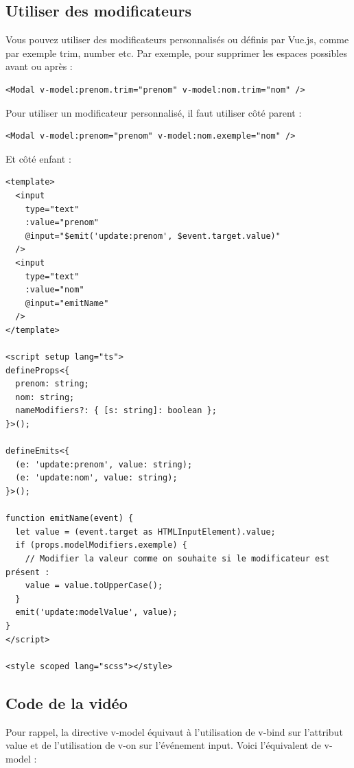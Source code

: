 \subsection{Utiliser des modificateurs}
Vous pouvez utiliser des modificateurs personnalisés ou définis par {\color{monOrange}Vue.js}, comme par exemple {\color{monOrange}trim, number} etc. Par exemple, pour supprimer les espaces possibles avant ou après :
\begin{verbatim}
<Modal v-model:prenom.trim="prenom" v-model:nom.trim="nom" />
\end{verbatim}
Pour utiliser un modificateur personnalisé, il faut utiliser côté parent :
\begin{verbatim}
<Modal v-model:prenom="prenom" v-model:nom.exemple="nom" />
\end{verbatim}
Et côté enfant :
\begin{verbatim}
<template>
  <input
    type="text"
    :value="prenom"
    @input="$emit('update:prenom', $event.target.value)"
  />
  <input
    type="text"
    :value="nom"
    @input="emitName"
  />
</template>

<script setup lang="ts">
defineProps<{
  prenom: string;
  nom: string;
  nameModifiers?: { [s: string]: boolean };
}>();

defineEmits<{
  (e: 'update:prenom', value: string);
  (e: 'update:nom', value: string);
}>();

function emitName(event) {
  let value = (event.target as HTMLInputElement).value;
  if (props.modelModifiers.exemple) {
    // Modifier la valeur comme on souhaite si le modificateur est présent :
    value = value.toUpperCase();
  }
  emit('update:modelValue', value);
}
</script>

<style scoped lang="scss"></style>
\end{verbatim}
\subsection{Code de la vidéo}
Pour rappel, la directive {\color{monOrange}v-model} équivaut à l'utilisation de {\color{monOrange}v-bind} sur l'attribut value et de l'utilisation de {\color{monOrange}v-on} sur l'événement {\color{monOrange}input}. Voici l'équivalent de {\color{monOrange}v-model} :

